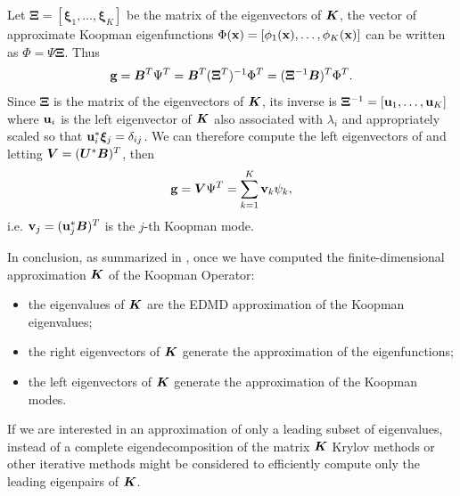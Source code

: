 Let $\bm{\Xi} = \left[\bm{\xi}_1,\dots,\bm{\xi}_K\right]$ be the matrix of the eigenvectors of $\vb*{K}$, the vector of approximate Koopman eigenfunctions $\Phi(\vb{x}) = \left[\phi_1(\vb{x}), \dots, \phi_K(\vb{x})\right]$ can be written as $\Phi = \Psi\bm{\Xi}$. Thus
\begin{equation}
    \vb{g} = \vb*{B}^T\Psi^T = \vb*{B}^T(\bm{\Xi}^T)^{-1}\Phi^T = (\bm{\Xi}^{-1}\vb*{B})^T\Phi^T.
\end{equation}
Since $\bm{\Xi}$ is the matrix of the eigenvectors of $\vb*{K}$, its inverse is $\bm{\Xi}^{-1} = \left[\vb{u}_1, \dots, \vb{u}_K\right]$ where $\vb{u}_i$ is the left eigenvector of $\vb*{K}$ also associated with $\lambda_i$ and appropriately scaled so that $\vb{u}_i^*\bm{\xi}_j = \delta_{ij}$. We can therefore compute the left eigenvectors of and letting  $\vb*{V} = (\vb*{U}^*\vb*{B})^T$, then
\begin{equation}
    \vb{g} = \vb*{V}\Psi^T = \sum_{k=1}^K \vb{v}_k\psi_k,
\end{equation}
i.e. $\vb{v}_j = (\vb{u}_j^*\vb*{B})^T$ is the $j$-th Koopman mode.

In conclusion, as summarized in ,  once we have computed the finite-dimensional approximation $\vb*{K}$ of the Koopman Operator:
\begin{itemize}
    \item the eigenvalues of $\vb*{K}$ are the EDMD approximation of the Koopman eigenvalues;
    \item the right eigenvectors of $\vb*{K}$ generate the approximation of the eigenfunctions;
    \item the left eigenvectors of $\vb*{K}$ generate the approximation of the Koopman modes.
\end{itemize}
If we are interested in an approximation of only a leading subset of eigenvalues, instead of a complete eigendecomposition of the matrix $\vb*{K}$ Krylov methods or other iterative methods might be considered to efficiently compute only the leading eigenpairs of $\vb*{K}$.

